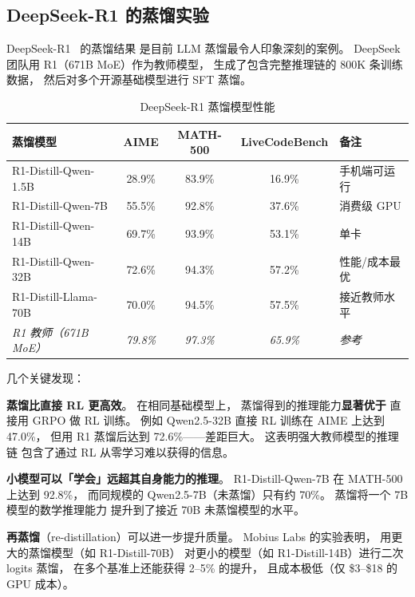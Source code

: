 \subsection{DeepSeek-R1 的蒸馏实验}

DeepSeek-R1~\cite{deepseekr1} 的蒸馏结果
是目前 LLM 蒸馏最令人印象深刻的案例。
DeepSeek 团队用 R1（671B MoE）作为教师模型，
生成了包含完整推理链的 800K 条训练数据，
然后对多个开源基础模型进行 SFT 蒸馏。

\begin{table}[H]
\centering\small
\renewcommand{\arraystretch}{1.3}
\caption{DeepSeek-R1 蒸馏模型性能}\label{tab:r1-distill}
\begin{tabularx}{\linewidth}{l c c c X}
\toprule
\rowcolor{figLightGray}
\textbf{蒸馏模型} & \textbf{AIME} & \textbf{MATH-500} & \textbf{LiveCodeBench} & \textbf{备注} \\
\midrule
R1-Distill-Qwen-1.5B & 28.9\% & 83.9\% & 16.9\% & 手机端可运行 \\
R1-Distill-Qwen-7B & 55.5\% & 92.8\% & 37.6\% & 消费级 GPU \\
R1-Distill-Qwen-14B & 69.7\% & 93.9\% & 53.1\% & 单卡 \\
R1-Distill-Qwen-32B & 72.6\% & 94.3\% & 57.2\% & 性能/成本最优 \\
R1-Distill-Llama-70B & 70.0\% & 94.5\% & 57.5\% & 接近教师水平 \\
\midrule
\textit{R1 教师（671B MoE）} & \textit{79.8\%} & \textit{97.3\%} & \textit{65.9\%} & \textit{参考} \\
\bottomrule
\end{tabularx}
\end{table}

几个关键发现：

\textbf{蒸馏比直接 RL 更高效}。
在相同基础模型上，
蒸馏得到的推理能力\textbf{显著优于}
直接用 GRPO 做 RL 训练。
例如 Qwen2.5-32B 直接 RL 训练在 AIME 上达到 47.0\%，
但用 R1 蒸馏后达到 72.6\%——差距巨大。
这表明强大教师模型的推理链
包含了通过 RL 从零学习难以获得的信息。

\textbf{小模型可以「学会」远超其自身能力的推理}。
R1-Distill-Qwen-7B 在 MATH-500 上达到 92.8\%，
而同规模的 Qwen2.5-7B（未蒸馏）只有约 70\%。
蒸馏将一个 7B 模型的数学推理能力
提升到了接近 70B 未蒸馏模型的水平。

\textbf{再蒸馏}（re-distillation）可以进一步提升质量。
Mobius Labs 的实验表明，
用更大的蒸馏模型（如 R1-Distill-70B）
对更小的模型（如 R1-Distill-14B）进行二次 logits 蒸馏，
在多个基准上还能获得 2--5\% 的提升，
且成本极低（仅 \$3--\$18 的 GPU 成本）。

